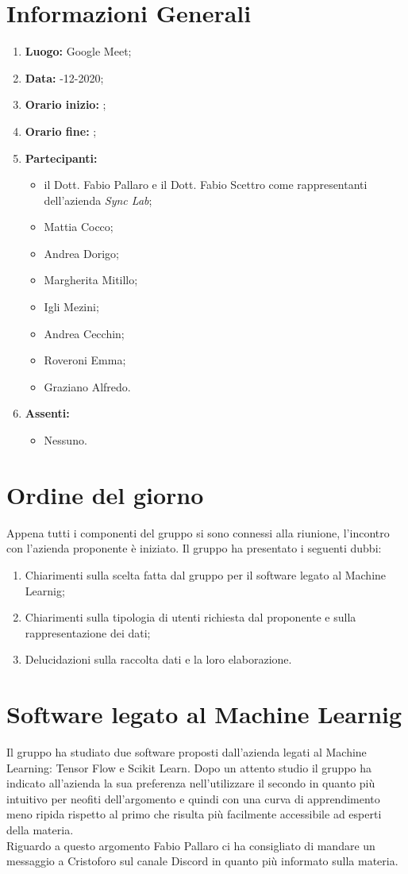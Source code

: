 \newpage
\section{Informazioni Generali}
\begin{enumerate}
	\item \textbf{Luogo:} \normalfont Google Meet;
	\item \textbf{Data:} -12-2020;
	\item \textbf{Orario inizio:} ;
	\item \textbf{Orario fine:} ;
	\item \textbf{Partecipanti:}
	\begin{itemize}
		\item il Dott. Fabio Pallaro e il Dott. Fabio Scettro come rappresentanti dell'azienda \textit{Sync Lab};
		\item Mattia Cocco; 
		\item Andrea Dorigo;
		\item Margherita Mitillo;
		\item Igli Mezini;
		\item Andrea Cecchin;
		\item Roveroni Emma;
		\item Graziano Alfredo.
	\end{itemize}
	\item \textbf{Assenti:}
	\begin{itemize}
		\item Nessuno.
	\end{itemize}
\end{enumerate}
\section{Ordine del giorno}
Appena tutti i componenti del gruppo si sono connessi alla riunione, l'incontro con l'azienda proponente è iniziato. Il gruppo ha presentato i seguenti dubbi:
\begin{enumerate}
	\item Chiarimenti sulla scelta fatta dal gruppo per il software legato al Machine Learnig;
	\item Chiarimenti sulla tipologia di utenti richiesta dal proponente e sulla rappresentazione dei dati;
	\item Delucidazioni sulla raccolta dati e la loro elaborazione.
\end{enumerate}
\section{Software legato al Machine Learnig}
Il gruppo ha studiato due software proposti dall'azienda legati al Machine Learning: Tensor Flow e Scikit Learn.
Dopo un attento studio il gruppo ha indicato all'azienda la sua preferenza nell'utilizzare il secondo in quanto più intuitivo per neofiti dell'argomento e quindi con una curva di apprendimento meno ripida rispetto al primo che risulta più facilmente accessibile ad esperti della materia. \\
Riguardo a questo argomento Fabio Pallaro ci ha consigliato di mandare un messaggio a Cristoforo sul canale Discord in quanto più informato sulla materia.
